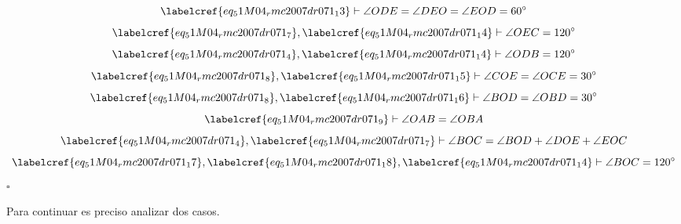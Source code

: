 \begin{equation} \label{eq_51M04_rmc2007dr071_14}
	\labelcref{eq_51M04_rmc2007dr071_13} \vdash \angle{ODE} = \angle{DEO} = \angle{EOD} = \ang{60}
\end{equation}
\begin{equation} \label{eq_51M04_rmc2007dr071_15}
	\labelcref{eq_51M04_rmc2007dr071_7}, \labelcref{eq_51M04_rmc2007dr071_14} \vdash \angle{OEC} = \ang{120}
\end{equation}
\begin{equation} \label{eq_51M04_rmc2007dr071_16}
	\labelcref{eq_51M04_rmc2007dr071_4}, \labelcref{eq_51M04_rmc2007dr071_14} \vdash \angle{ODB} = \ang{120}
\end{equation}
\begin{equation} \label{eq_51M04_rmc2007dr071_17}
	\labelcref{eq_51M04_rmc2007dr071_8}, \labelcref{eq_51M04_rmc2007dr071_15} \vdash \angle{COE} = \angle{OCE} = \ang{30}
\end{equation}
\begin{equation} \label{eq_51M04_rmc2007dr071_18}
	\labelcref{eq_51M04_rmc2007dr071_8}, \labelcref{eq_51M04_rmc2007dr071_16} \vdash \angle{BOD} = \angle{OBD} = \ang{30}
\end{equation}
\begin{equation} \label{eq_51M04_rmc2007dr071_19}
	\labelcref{eq_51M04_rmc2007dr071_9} \vdash \angle{OAB} = \angle{OBA}
\end{equation}
\begin{equation} \label{eq_51M04_rmc2007dr071_19b}
	\labelcref{eq_51M04_rmc2007dr071_4}, \labelcref{eq_51M04_rmc2007dr071_7} \vdash \angle{BOC} = \angle{BOD} + \angle{DOE} + \angle{EOC}
\end{equation}
\begin{equation} \label{eq_51M04_rmc2007dr071_19c}
	\labelcref{eq_51M04_rmc2007dr071_17}, \labelcref{eq_51M04_rmc2007dr071_18}, \labelcref{eq_51M04_rmc2007dr071_14} \vdash \angle{BOC} = \ang{120}
\end{equation}
\hfill $\square$

Para continuar es preciso analizar dos casos.

